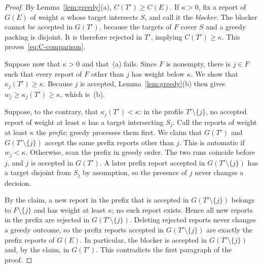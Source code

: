 \documentclass[format=acmsmall, review=false]{acmart}
\begin{document}
\begin{proof}
By Lemma~\ref{lem:greedy}(a), \(C(T')\ge C(E)\). If \(\kappa>0\),
fix a report of \(G(E)\) of weight \(\kappa\) whose target
intersects \(S\), and call it the \emph{blocker}. The blocker
cannot be accepted in \(G(T')\), because the targets of \(F\)
cover \(S\) and a greedy packing is disjoint. It is therefore
rejected in \(T'\), implying \(C(T')\ge\kappa\). This
proves~\eqref{eq:C-comparison}.

Suppose now that \(\kappa>0\) and that~(a) fails. Since \(F\) is
nonempty, there is \(j\in F\) such that every report of \(F\)
other than \(j\) has weight below \(\kappa\). We show that
\(\kappa_j(T')\ge\kappa\). Because \(j\) is accepted,
Lemma~\ref{lem:greedy}(b) then gives
\(w_j\ge\kappa_j(T')\ge\kappa\), which is~(b).

Suppose, to the contrary, that \(\kappa_j(T')<\kappa\): in the
profile \(T'\setminus\{j\}\), no accepted report of weight at
least \(\kappa\) has a target intersecting \(S_j\). Call the
reports of weight at least \(\kappa\) the \emph{prefix}; greedy
processes them first. We claim that \(G(T')\) and
\(G(T'\setminus\{j\})\) accept the same prefix reports other
than \(j\). This is automatic if \(w_j<\kappa\). Otherwise, scan
the prefix in greedy order. The two runs coincide before \(j\),
and \(j\) is accepted in \(G(T')\). A later prefix report
accepted in \(G(T'\setminus\{j\})\) has a target disjoint from
\(S_j\) by assumption, so the presence of \(j\) never changes a
decision.

By the claim, a new report in the prefix that is accepted in
\(G(T'\setminus\{j\})\) belongs to \(F\setminus\{j\}\) and has
weight at least \(\kappa\); no such report exists. Hence all new
reports in the prefix are rejected in \(G(T'\setminus\{j\})\).
Deleting rejected reports never changes a greedy outcome, so the
prefix reports accepted in \(G(T'\setminus\{j\})\) are exactly
the prefix reports of \(G(E)\). In particular, the blocker is
accepted in \(G(T'\setminus\{j\})\) and, by the claim, in
\(G(T')\). This contradicts the first paragraph of the proof.
\end{proof}
\end{document}
